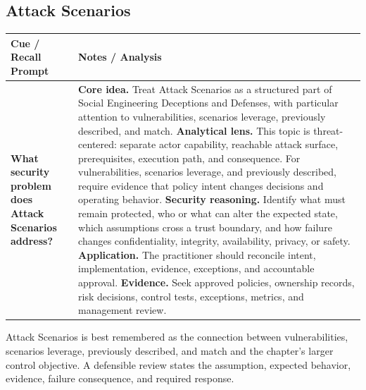 \documentclass[11pt]{article}
\newcommand{\CornellHeader}{%
\rowcolor{Navy}\color{white}\bfseries Cue / Recall Prompt & \color{white}\bfseries Notes / Analysis\\\hline}
\newcommand{\CornellRow}[2]{%
\cellcolor{CueGray}\RaggedRight\textbf{#1} & \RaggedRight #2\\\hline}
\begin{document}
\subsection*{Attack Scenarios}
\begin{longtable}{>{\RaggedRight\arraybackslash}p{}|>{\RaggedRight\arraybackslash}p{}}
\CornellHeader
\CornellRow{What security problem does Attack Scenarios address?}{\textbf{Core idea.} Treat Attack Scenarios as a structured part of Social Engineering Deceptions and Defenses, with particular attention to vulnerabilities, scenarios leverage, previously described, and match. \textbf{Analytical lens.} This topic is threat-centered: separate actor capability, reachable attack surface, prerequisites, execution path, and consequence. For vulnerabilities, scenarios leverage, and previously described, require evidence that policy intent changes decisions and operating behavior. \textbf{Security reasoning.} Identify what must remain protected, who or what can alter the expected state, which assumptions cross a trust boundary, and how failure changes confidentiality, integrity, availability, privacy, or safety. \textbf{Application.} The practitioner should reconcile intent, implementation, evidence, exceptions, and accountable approval. \textbf{Evidence.} Seek approved policies, ownership records, risk decisions, control tests, exceptions, metrics, and management review.}
\end{longtable}
\begin{topicsummary}
Attack Scenarios is best remembered as the connection between vulnerabilities, scenarios leverage, previously described, and match and the chapter's larger control objective. A defensible review states the assumption, expected behavior, evidence, failure consequence, and required response.
\end{topicsummary}
\end{document}
